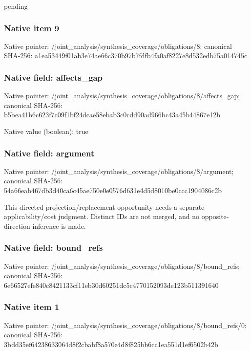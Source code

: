 \documentclass[10pt,a4paper]{article}
\begin{document}
\begingroup\raggedright\sloppy pending\par\endgroup

\subsubsection{Native item 9}
Native pointer: /joint\_\allowbreak{}analysis/synthesis\_\allowbreak{}coverage/obligations/8; canonical SHA-256: a1ea53449f01ab3e74ae66c370b97b7fdfb4fa0af8227e8d532edb75a014745c

\subsubsection{Native field: affects\_\allowbreak{}gap}
Native pointer: /joint\_\allowbreak{}analysis/synthesis\_\allowbreak{}coverage/obligations/8/affects\_\allowbreak{}gap; canonical SHA-256: b5bea41b6c623f7c09f1bf24dcae58ebab3c0cdd90ad966bc43a45b44867e12b

Native value (boolean): true

\subsubsection{Native field: argument}
Native pointer: /joint\_\allowbreak{}analysis/synthesis\_\allowbreak{}coverage/obligations/8/argument; canonical SHA-256: 54a66eab467db3d40ca6c45ae750e0e0576d631e4d5d8010be0ccc1904086c2b

\begingroup\raggedright\sloppy This directed projection/\allowbreak{}replacement opportunity needs a separate applicability/\allowbreak{}cost judgment. Distinct IDs are not merged,\allowbreak{} and no opposite-direction inference is made.\par\endgroup

\subsubsection{Native field: bound\_\allowbreak{}refs}
Native pointer: /joint\_\allowbreak{}analysis/synthesis\_\allowbreak{}coverage/obligations/8/bound\_\allowbreak{}refs; canonical SHA-256: 6e66527efe840c8421133cf11eb30d60251dc5c4770152093de123b511391640

\subsubsection{Native item 1}
Native pointer: /joint\_\allowbreak{}analysis/synthesis\_\allowbreak{}coverage/obligations/8/bound\_\allowbreak{}refs/0; canonical SHA-256: 3bdd35ef64238633064d8f2cbabf8a570e4d8f825bb6cc1ea551d1ef6502b42b
\end{document}
